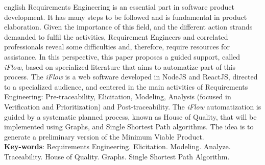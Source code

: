 \begin{resumo}[Abstract]
 \begin{otherlanguage*}{english}
    Requirements Engineering is an essential part in software product development. It has many steps to be followed and is fundamental in product elaboration. Given the importance of this field, and the different action strands demanded to fulfil the activities, Requirement Engineers and correlated professionals reveal some difficulties and, therefore, require resources for assistance. In this perspective, this paper proposes a guided support, called \textit{iFlow}, based on specialized literature that aims to automatize part of this process. The \textit{iFlow} is a web software developed in NodeJS and ReactJS, directed to a specialized audience, and centered in the main activities of Requirements Engineering: Pre-traceability, Elicitation, Modeling, Analysis (focused in Verification and Prioritization) and Post-traceability. The \textit{iFlow} automatization is guided by a systematic planned process, known as House of Quality, that will be implemented using Graphs, and Single Shortest Path algorithms. The idea is to generate a preliminary version of the Minimum Viable Product.
   \vspace{\onelineskip}
   \noindent
   \\
   \textbf{Key-words}: Requirements Engineering. Elicitation. Modeling. Analyze. Traceability. House of Quality. Graphs. Single Shortest Path Algorithm.
 \end{otherlanguage*}
\end{resumo}